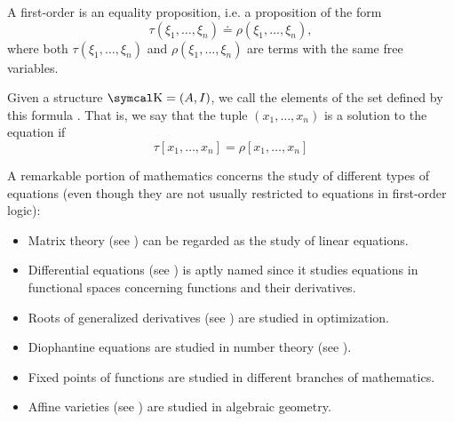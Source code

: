 \begin{definition}\label{def:first_order_equation}
  A first-order  is an equality proposition, i.e. a proposition of the form
  \begin{equation*}
    \tau(\xi_1, \ldots, \xi_n) \doteq \rho(\xi_1, \ldots, \xi_n),
  \end{equation*}
  where both \( \tau(\xi_1, \ldots, \xi_n) \) and \( \rho(\xi_1, \ldots, \xi_n) \) are terms with the same free variables.

  Given a structure \( \CK = (A, I) \), we call the elements of the set defined by this formula . That is, we say that the tuple \( (x_1, \ldots, x_n) \) is a solution to the equation if
  \begin{equation*}
    \tau[x_1, \ldots, x_n] = \rho[x_1, \ldots, x_n]
  \end{equation*}
\end{definition}

\begin{remark}\label{remark:equations}
  A remarkable portion of mathematics concerns the study of different types of equations (even though they are not usually restricted to equations in first-order logic):

  \begin{itemize}
    \item Matrix theory (see ) can be regarded as the study of linear equations.
    \item Differential equations (see ) is aptly named since it studies equations in functional spaces concerning functions and their derivatives.
    \item Roots of generalized derivatives (see ) are studied in optimization.
    \item Diophantine equations are studied in number theory (see ).
    \item Fixed points of functions are studied in different branches of mathematics.
    \item Affine varieties (see ) are studied in algebraic geometry.
  \end{itemize}
\end{remark}

